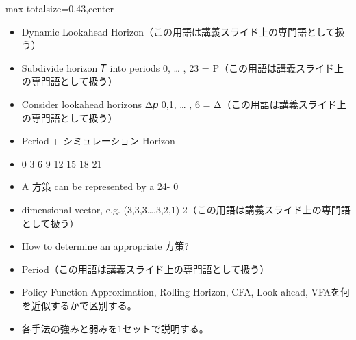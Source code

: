 \clearpage
{}
\begin{minipage}[t]{0.405\textwidth}
\begin{adjustbox}{max totalsize={\textwidth}{0.43\textheight},center}
\begin{minipage}{\textwidth}\scriptsize
{}\begin{itemize}
\item Dynamic Lookahead Horizon（この用語は講義スライド上の専門語として扱う）
\item Subdivide horizon 𝑇 into periods 0, … , 23 = Ρ（この用語は講義スライド上の専門語として扱う）
\item Consider lookahead horizons Δ𝑝 0,1, … , 6 = Δ（この用語は講義スライド上の専門語として扱う）
\item Period + シミュレーション Horizon
\item 0 3 6 9 12 15 18 21
\item A 方策 can be represented by a 24- 0
\item dimensional vector, e.g. (3,3,3…,3,2,1) 2（この用語は講義スライド上の専門語として扱う）
\item How to determine an appropriate 方策?
\item Period（この用語は講義スライド上の専門語として扱う）
\end{itemize}\begin{itemize}
\item Policy Function Approximation, Rolling Horizon, CFA, Look-ahead, VFAを何を近似するかで区別する。
\item 各手法の強みと弱みを1セットで説明する。
\end{itemize}
\end{minipage}
\end{adjustbox}
\end{minipage}\hfill
